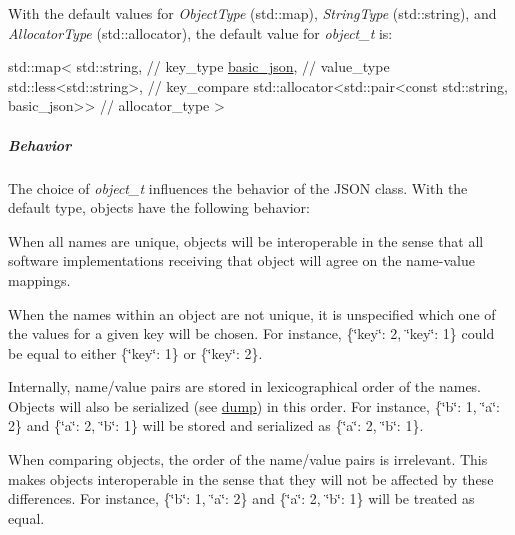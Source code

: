With the default values for {\itshape Object\+Type} ({\ttfamily std\+::map}), {\itshape String\+Type} ({\ttfamily std\+::string}), and {\itshape Allocator\+Type} ({\ttfamily std\+::allocator}), the default value for {\itshape object\+\_\+t} is\+:


\begin{DoxyCode}
std::map<
  std::string, \textcolor{comment}{// key\_type}
  \mbox{\hyperlink{classnlohmann_1_1basic__json_aed115142bd0c6c66c864700e0467df55}{basic\_json}}, \textcolor{comment}{// value\_type}
  std::less<std::string>, \textcolor{comment}{// key\_compare}
  std::allocator<std::pair<const std::string, basic\_json>> \textcolor{comment}{// allocator\_type}
>
\end{DoxyCode}


\subparagraph*{Behavior}

The choice of {\itshape object\+\_\+t} influences the behavior of the J\+S\+ON class. With the default type, objects have the following behavior\+:


\begin{DoxyItemize}
\item When all names are unique, objects will be interoperable in the sense that all software implementations receiving that object will agree on the name-\/value mappings.
\item When the names within an object are not unique, it is unspecified which one of the values for a given key will be chosen. For instance, {\ttfamily \{\char`\"{}key\char`\"{}\+: 2, \char`\"{}key\char`\"{}\+: 1\}} could be equal to either {\ttfamily \{\char`\"{}key\char`\"{}\+: 1\}} or {\ttfamily \{\char`\"{}key\char`\"{}\+: 2\}}.
\item Internally, name/value pairs are stored in lexicographical order of the names. Objects will also be serialized (see \mbox{\hyperlink{classnlohmann_1_1basic__json_a50ec80b02d0f3f51130d4abb5d1cfdc5}{dump}}) in this order. For instance, {\ttfamily \{\char`\"{}b\char`\"{}\+: 1, \char`\"{}a\char`\"{}\+: 2\}} and {\ttfamily \{\char`\"{}a\char`\"{}\+: 2, \char`\"{}b\char`\"{}\+: 1\}} will be stored and serialized as {\ttfamily \{\char`\"{}a\char`\"{}\+: 2, \char`\"{}b\char`\"{}\+: 1\}}.
\item When comparing objects, the order of the name/value pairs is irrelevant. This makes objects interoperable in the sense that they will not be affected by these differences. For instance, {\ttfamily \{\char`\"{}b\char`\"{}\+: 1, \char`\"{}a\char`\"{}\+: 2\}} and {\ttfamily \{\char`\"{}a\char`\"{}\+: 2, \char`\"{}b\char`\"{}\+: 1\}} will be treated as equal.
\end{DoxyItemize}

